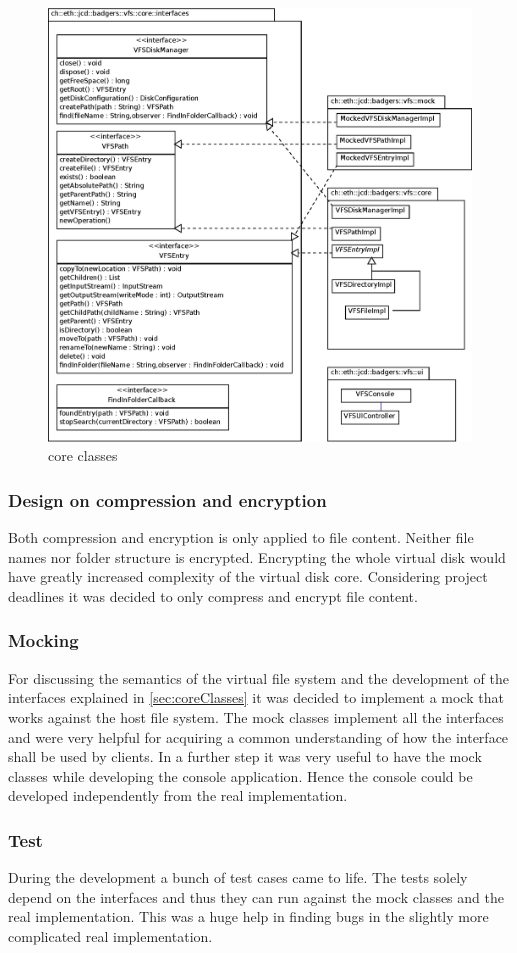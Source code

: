 \begin{figure}[h!]
\centering
\includegraphics[width=1\textwidth]{figures/core_classes.eps}
\caption{core classes}
\label{fig:core_classes}
\end{figure}

\subsubsection{Design on compression and encryption}

Both compression and encryption is only applied to file content. 
Neither file names nor folder structure is encrypted. 
Encrypting the whole virtual disk would have greatly increased complexity of the virtual disk core.  
Considering project deadlines it was decided to only compress and encrypt file content.


\subsubsection{Mocking}
For discussing the semantics of the virtual file system and the development of 
the interfaces explained in \ref{sec:coreClasses} it was decided to implement a mock
that works against the host file system. The mock classes implement all
the interfaces and were very helpful for acquiring a common understanding of how
the interface shall be used by clients. In a further step it was very useful to have
the mock classes while developing the console application. Hence the console
could be developed independently from the real implementation.
\subsubsection{Test}
During the development a bunch of test cases came to life. The tests solely
depend on the interfaces and thus they can run against the mock classes and the
real implementation. This was a huge help in finding bugs in the slightly more
complicated real implementation.